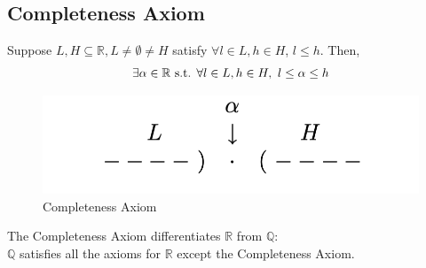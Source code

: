 \documentclass[11pt]{elegantbook}
\begin{document}
\subsection{Completeness Axiom}
\begin{proposition}\label{Completeness Axiom}
    \normalfont
    Suppose $L,H\subseteq \mathbb{R},L\neq\emptyset\neq H$ satisfy $\forall l\in L, h\in H$, $l\leq h$. Then, $$\exists\alpha\in \mathbb{R} \textnormal{ s.t. }\forall l\in L, h\in H,\ l\leq\alpha\leq h$$
\end{proposition}
\begin{center}\begin{figure}[htbp]
    \centering
    \includegraphics[scale=0.25]{CA.png}
    \caption{Completeness Axiom}
    \label{}
\end{figure}\end{center}

\begin{claim}
    \normalfont
    The Completeness Axiom differentiates $\mathbb{R}$ from $\mathbb{Q}$:\\
    $\mathbb{Q}$ satisfies all the axioms for $\mathbb{R}$ except the Completeness Axiom.
\end{claim}
\end{document}
